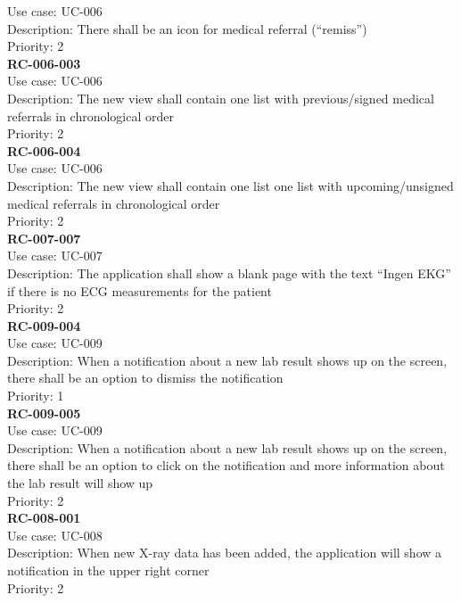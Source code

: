Use case: UC-006 \\
Description: There shall be an icon for medical referral (“remiss”) \\
Priority: 2 \\
\newline
\textbf{RC-006-003} \\
Use case: UC-006 \\
Description: The new view shall contain one list with previous/signed medical referrals in chronological order  \\
Priority: 2 \\
\newline
\textbf{RC-006-004} \\
Use case: UC-006 \\
Description: The new view shall contain one list one list with upcoming/unsigned medical referrals in chronological order \\
Priority: 2 \\
\newline
\textbf{RC-007-007} \\
Use case: UC-007 \\
Description: The application shall show a blank page with the text “Ingen EKG” if there is no ECG measurements for the patient \\
Priority: 2 \\
\newline
\textbf{RC-009-004} \\
Use case: UC-009 \\
Description: When a notification about a new lab result shows up on the screen, there shall be an option to dismiss the notification \\
Priority: 1 \\
\newline
\textbf{RC-009-005} \\
Use case: UC-009 \\
Description: When a notification about a new lab result shows up on the screen, there shall be an option to click on the notification and more information about the lab result will show up \\
Priority: 2 \\
\newline
\textbf{RC-008-001} \\
Use case: UC-008 \\
Description: When new X-ray data has been added, the application will show a notification in the upper right corner  \\
Priority: 2 \\
